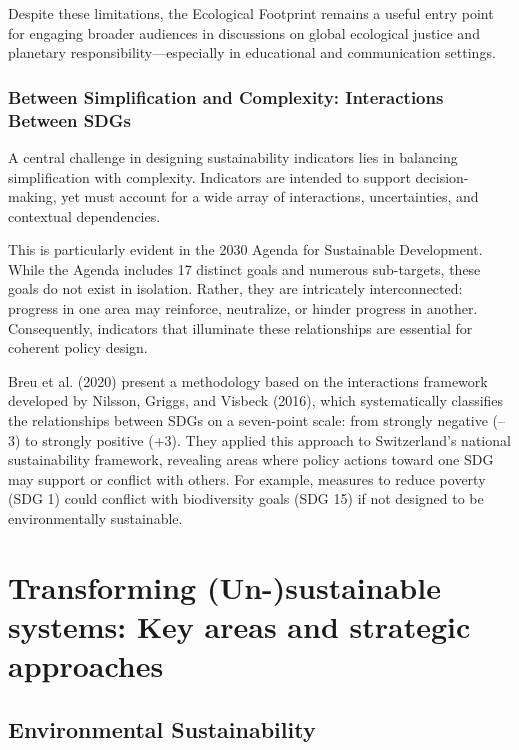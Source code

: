 \documentclass[
  a4paper,
  openany]{book}
\begin{document}
Despite these limitations, the Ecological Footprint remains a useful
entry point for engaging broader audiences in discussions on global
ecological justice and planetary responsibility---especially in
educational and communication settings.

\section{Between Simplification and Complexity: Interactions Between
SDGs}\label{between-simplification-and-complexity-interactions-between-sdgs}

A central challenge in designing sustainability indicators lies in
balancing simplification with complexity. Indicators are intended to
support decision-making, yet must account for a wide array of
interactions, uncertainties, and contextual dependencies.

This is particularly evident in the 2030 Agenda for Sustainable
Development. While the Agenda includes 17 distinct goals and numerous
sub-targets, these goals do not exist in isolation. Rather, they are
intricately interconnected: progress in one area may reinforce,
neutralize, or hinder progress in another. Consequently, indicators that
illuminate these relationships are essential for coherent policy design.

Breu et al. (2020) present a methodology based on the interactions
framework developed by Nilsson, Griggs, and Visbeck (2016), which
systematically classifies the relationships between SDGs on a
seven-point scale: from strongly negative (--3) to strongly positive
(+3). They applied this approach to Switzerland's national
sustainability framework, revealing areas where policy actions toward
one SDG may support or conflict with others. For example, measures to
reduce poverty (SDG 1) could conflict with biodiversity goals (SDG 15)
if not designed to be environmentally sustainable.

\part{Transforming (Un-)sustainable systems: Key areas and strategic
approaches}

\chapter{Environmental
Sustainability}\label{environmental-sustainability}
\end{document}
